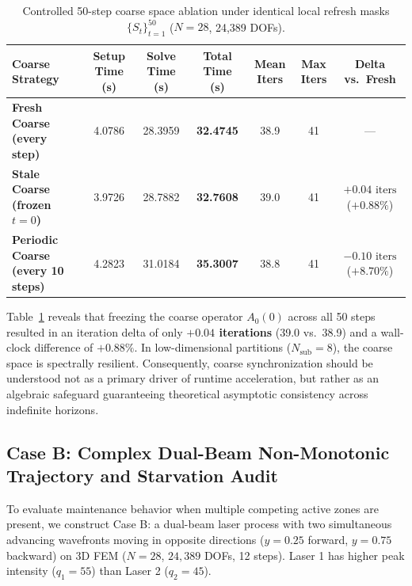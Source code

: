\documentclass[preprint,12pt,3p]{elsarticle}
\begin{document}
\begin{table}[htbp]
\centering
\small
\caption{Controlled 50-step coarse space ablation under identical local refresh masks $\{S_t\}_{t=1}^{50}$ ($N=28$, 24,389 DOFs).}
\label{tab:coarse_ablation_50step}
\begin{tabular}{lcccccc}
\toprule
\textbf{Coarse Strategy} & \textbf{Setup Time (s)} & \textbf{Solve Time (s)} & \textbf{Total Time (s)} & \textbf{Mean Iters} & \textbf{Max Iters} & \textbf{Delta vs.\ Fresh} \\
\midrule
\textbf{Fresh Coarse (every step)} & 4.0786 & 28.3959 & \textbf{32.4745} & 38.9 & 41 & --- \\
\textbf{Stale Coarse (frozen $t=0$)} & 3.9726 & 28.7882 & \textbf{32.7608} & 39.0 & 41 & $+0.04\text{ iters}$ ($+0.88\%$) \\
\textbf{Periodic Coarse (every 10 steps)} & 4.2823 & 31.0184 & \textbf{35.3007} & 38.8 & 41 & $-0.10\text{ iters}$ ($+8.70\%$) \\
\bottomrule
\end{tabular}
\end{table}

Table~\ref{tab:coarse_ablation_50step} reveals that freezing the coarse operator $A_0(0)$ across all 50 steps resulted in an iteration delta of only \textbf{$+0.04$ iterations} (39.0 vs.\ 38.9) and a wall-clock difference of \textbf{$+0.88\%$}. In low-dimensional partitions ($N_{\text{sub}}=8$), the coarse space is spectrally resilient. Consequently, coarse synchronization should be understood not as a primary driver of runtime acceleration, but rather as an algebraic safeguard guaranteeing theoretical asymptotic consistency across indefinite horizons.

\subsection{Case B: Complex Dual-Beam Non-Monotonic Trajectory and Starvation Audit}
\label{subsec:case_b_dual_beam}

To evaluate maintenance behavior when multiple competing active zones are present, we construct Case B: a dual-beam laser process with two simultaneous advancing wavefronts moving in opposite directions ($y=0.25$ forward, $y=0.75$ backward) on 3D FEM ($N=28$, $24,389$ DOFs, 12 steps). Laser 1 has higher peak intensity ($q_1 = 55$) than Laser 2 ($q_2 = 45$).
\end{document}
